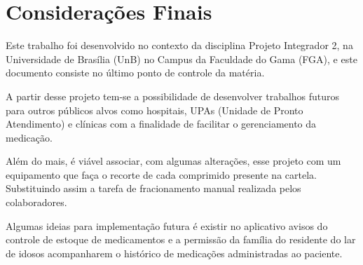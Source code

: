 \chapter[Considerações Finais]{Considerações Finais}

Este trabalho foi desenvolvido no contexto da disciplina Projeto Integrador 2, na Universidade de Brasília (UnB) no Campus da Faculdade do Gama (FGA), e este documento consiste no último ponto de controle da matéria. 


A partir desse projeto tem-se a possibilidade de desenvolver trabalhos futuros para outros públicos alvos como hospitais, UPAs (Unidade de Pronto Atendimento) e clínicas com a finalidade de facilitar o gerenciamento da medicação. 

Além do mais, é viável associar, com algumas alterações, esse projeto com um equipamento que faça o recorte de cada comprimido presente na cartela. Substituindo assim a tarefa de   fracionamento manual realizada pelos colaboradores. 

Algumas ideias para implementação futura é existir no aplicativo avisos do controle de estoque de medicamentos e a permissão da família do residente do lar de idosos acompanharem o histórico de medicações administradas ao paciente.



